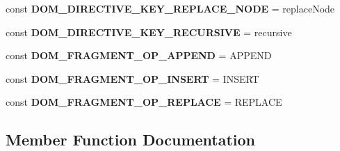 \begin{DoxyCompactItemize}
\item 
\hypertarget{class_able_polecat___dom_a4385b3704b44d2835b4099538792ef59}{}const {\bfseries D\+O\+M\+\_\+\+D\+I\+R\+E\+C\+T\+I\+V\+E\+\_\+\+K\+E\+Y\+\_\+\+R\+E\+P\+L\+A\+C\+E\+\_\+\+N\+O\+D\+E} = \textquotesingle{}replace\+Node\textquotesingle{}\label{class_able_polecat___dom_a4385b3704b44d2835b4099538792ef59}

\item 
\hypertarget{class_able_polecat___dom_a2ecfe5f0e8449a106eba92f439856956}{}const {\bfseries D\+O\+M\+\_\+\+D\+I\+R\+E\+C\+T\+I\+V\+E\+\_\+\+K\+E\+Y\+\_\+\+R\+E\+C\+U\+R\+S\+I\+V\+E} = \textquotesingle{}recursive\textquotesingle{}\label{class_able_polecat___dom_a2ecfe5f0e8449a106eba92f439856956}

\item 
\hypertarget{class_able_polecat___dom_a0b10ce4e3978b1b2d4392f446427398e}{}const {\bfseries D\+O\+M\+\_\+\+F\+R\+A\+G\+M\+E\+N\+T\+\_\+\+O\+P\+\_\+\+A\+P\+P\+E\+N\+D} = \textquotesingle{}A\+P\+P\+E\+N\+D\textquotesingle{}\label{class_able_polecat___dom_a0b10ce4e3978b1b2d4392f446427398e}

\item 
\hypertarget{class_able_polecat___dom_aeefdd22099fe43624e16efdef386ec95}{}const {\bfseries D\+O\+M\+\_\+\+F\+R\+A\+G\+M\+E\+N\+T\+\_\+\+O\+P\+\_\+\+I\+N\+S\+E\+R\+T} = \textquotesingle{}I\+N\+S\+E\+R\+T\textquotesingle{}\label{class_able_polecat___dom_aeefdd22099fe43624e16efdef386ec95}

\item 
\hypertarget{class_able_polecat___dom_ad3b4648be1234c73de40721b5c5bbf81}{}const {\bfseries D\+O\+M\+\_\+\+F\+R\+A\+G\+M\+E\+N\+T\+\_\+\+O\+P\+\_\+\+R\+E\+P\+L\+A\+C\+E} = \textquotesingle{}R\+E\+P\+L\+A\+C\+E\textquotesingle{}\label{class_able_polecat___dom_ad3b4648be1234c73de40721b5c5bbf81}

\end{DoxyCompactItemize}


\subsection{Member Function Documentation}
\hypertarget{class_able_polecat___dom_abc271ed97ae920faeed49b3b268021e7}{}
